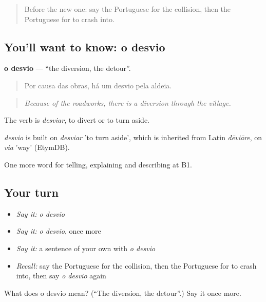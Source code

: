 \label{lesson:PT-C409-desvio}



\begin{quote}
Before the new one: say the Portuguese for the collision, then the Portuguese for to crash into.
\end{quote}

\subsection*{You'll want to know: o desvio}
\textbf{o desvio} — \textquotedblleft{}the diversion, the detour\textquotedblright{}.

\begin{quote}
Por causa das obras, há um desvio pela aldeia.
\end{quote}

\begin{quote}
\emph{Because of the roadworks, there is a diversion through the village.}
\end{quote}

The verb is \emph{desviar}, to divert or to turn aside.

\begin{cousinweb}
\emph{desvio} is built on \emph{desviar} 'to turn aside', which is inherited from Latin \emph{dēviāre}, on \emph{via} 'way' (EtymDB).
\end{cousinweb}

\begin{grammarlens}[title={What you've built}]
One more word for telling, explaining and describing at B1.
\end{grammarlens}

\subsection*{Your turn}
\begin{itemize}
\raggedright
  \item \emph{Say it:} \emph{o desvio}
  \item \emph{Say it:} \emph{o desvio}, once more
  \item \emph{Say it:} a sentence of your own with \emph{o desvio}
  \item \emph{Recall:} say the Portuguese for the collision, then the Portuguese for to crash into, then say \emph{o desvio} again
\end{itemize}

\begin{tcolorbox}[breakable,colback=teal!4,colframe=teal!35!black,title={Before you move on}]
What does o desvio mean? (\textquotedblleft{}The diversion, the detour\textquotedblright{}.) Say it once more.
\end{tcolorbox}
